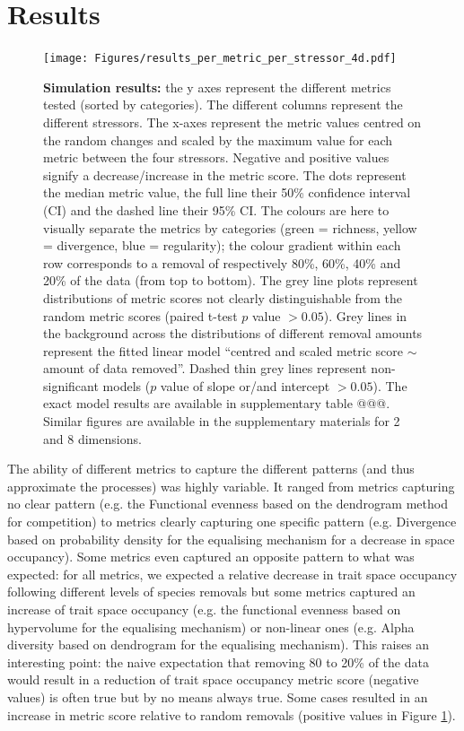 \documentclass[12pt,letterpaper]{article}
\begin{document}
\section{Results}


\begin{figure}[!htbp]
\centering
   \texttt{[image: Figures/results\_per\_metric\_per\_stressor\_4d.pdf]}
\caption{\scriptsize{\textbf{Simulation results:} the y axes represent the different metrics tested (sorted by categories).
The different columns represent the different stressors. The x-axes represent the metric values centred on the random changes and scaled by the maximum value for each metric between the four stressors.
Negative and positive values signify a decrease/increase in the metric score.
The dots represent the median metric value, the full line their 50\% confidence interval (CI) and the dashed line their 95\% CI.
The colours are here to visually separate the metrics by categories (green = richness, yellow = divergence, blue = regularity); the colour gradient within each row corresponds to a removal of respectively 80\%, 60\%, 40\% and 20\% of the data (from top to bottom).
The grey line plots represent distributions of metric scores not clearly distinguishable from the random metric scores (paired t-test $p$ value $> 0.05$).
Grey lines in the background across the distributions of different removal amounts represent the fitted linear model ``centred and scaled metric score $\sim$ amount of data removed''.
Dashed thin grey lines represent non-significant models ($p$ value of slope or/and intercept $> 0.05$).
The exact model results are available in supplementary table @@@.
Similar figures are available in the supplementary materials for 2 and 8 dimensions.}}
\label{Fig:simulation_results}
\end{figure}
\bigskip

The ability of different metrics to capture the different patterns (and thus approximate the processes) was highly variable.
It ranged from metrics capturing no clear pattern (e.g. the Functional evenness based on the dendrogram method for competition) to metrics clearly capturing one specific pattern (e.g. Divergence based on probability density for the equalising mechanism for a decrease in space occupancy).
Some metrics even captured an opposite pattern to what was expected: for all metrics, we expected a relative decrease in trait space occupancy following different levels of species removals but some metrics captured an increase of trait space occupancy (e.g. the functional evenness based on hypervolume for the equalising mechanism) or non-linear ones (e.g. Alpha diversity based on dendrogram for the equalising mechanism).
This raises an interesting point: the naive expectation that removing 80 to 20\% of the data would result in a reduction of trait space occupancy metric score (negative values) is often true but by no means always true.
Some cases resulted in an increase in metric score relative to random removals (positive values in Figure \ref{Fig:simulation_results}).
\end{document}

